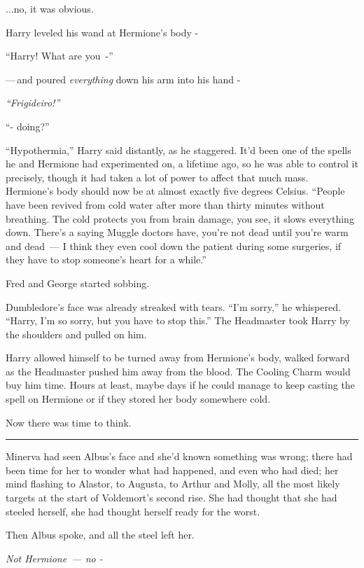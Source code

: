 ...no, it was obvious.

Harry leveled his wand at Hermione's body -

``Harry! What are you~-''

---\,and poured \emph{everything} down his arm into his hand -

\emph{``Frigideiro!''}

``- doing?''

``Hypothermia,'' Harry said distantly, as he staggered. It'd been one of the spells he and Hermione had experimented on, a lifetime ago, so he was able to control it precisely, though it had taken a lot of power to affect that much mass. Hermione's body should now be at almost exactly five degrees Celsius. ``People have been revived from cold water after more than thirty minutes without breathing. The cold protects you from brain damage, you see, it slows everything down. There's a saying Muggle doctors have, you're not dead until you're warm and dead~--- I think they even cool down the patient during some surgeries, if they have to stop someone's heart for a while.''

Fred and George started sobbing.

Dumbledore's face was already streaked with tears. ``I'm sorry,'' he whispered. ``Harry, I'm so sorry, but you have to stop this.'' The Headmaster took Harry by the shoulders and pulled on him.

Harry allowed himself to be turned away from Hermione's body, walked forward as the Headmaster pushed him away from the blood. The Cooling Charm would buy him time. Hours at least, maybe days if he could manage to keep casting the spell on Hermione or if they stored her body somewhere cold.

Now there was time to think.

\begin{center}\rule{3in}{0.4pt}\end{center}

Minerva had seen Albus's face and she'd known something was wrong; there had been time for her to wonder what had happened, and even who had died; her mind flashing to Alastor, to Augusta, to Arthur and Molly, all the most likely targets at the start of Voldemort's second rise. She had thought that she had steeled herself, she had thought herself ready for the worst.

Then Albus spoke, and all the steel left her.

\emph{Not Hermione~--- no -}

